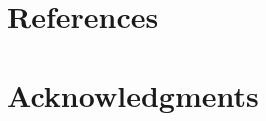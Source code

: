 \documentclass{article}
\begin{document}
\section{References}
\section{Acknowledgments}

\end{document}
